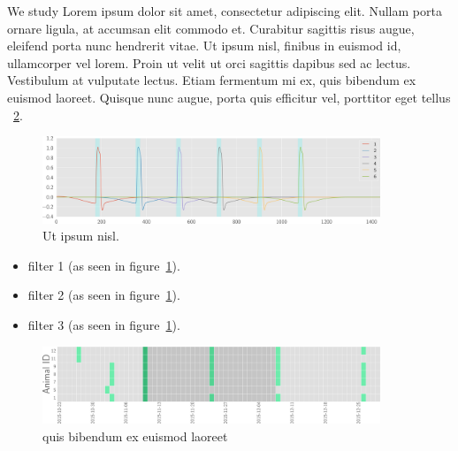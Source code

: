 We study Lorem ipsum dolor sit amet, consectetur adipiscing elit. Nullam porta ornare ligula, at accumsan elit commodo et. Curabitur sagittis risus augue, eleifend porta nunc hendrerit vitae. Ut ipsum nisl, finibus in euismod id, ullamcorper vel lorem. Proin ut velit ut orci sagittis dapibus sed ac lectus. Vestibulum at vulputate lectus. Etiam fermentum mi ex, quis bibendum ex euismod laoreet. Quisque nunc augue, porta quis efficitur vel, porttitor eget tellus ~\ref{fig:tt}.

\vspace{0.5em}
\begin{figure}
	\begin{minipage}{0.94\textwidth}
		\centering\includegraphics[width=0.9\textwidth]{img/dm.png}
		\caption{Ut ipsum nisl.}
		\label{fig:stim}
	\end{minipage}
\end{figure}

\begin{itemize}

	\item filter 1 (as seen in figure~\ref{fig:stim}).
	
 	\item filter 2 (as seen in figure~\ref{fig:stim}).
 	
 	\item filter 3 (as seen in figure~\ref{fig:stim}).
 	
\end{itemize}
\vspace{0.5em}
\begin{figure}
	\begin{minipage}{0.94\textwidth}
		\centering\includegraphics[width=0.9\textwidth]{img/tt.png}
		\caption{quis bibendum ex euismod laoreet}
		\label{fig:tt}
	\end{minipage}
\end{figure}